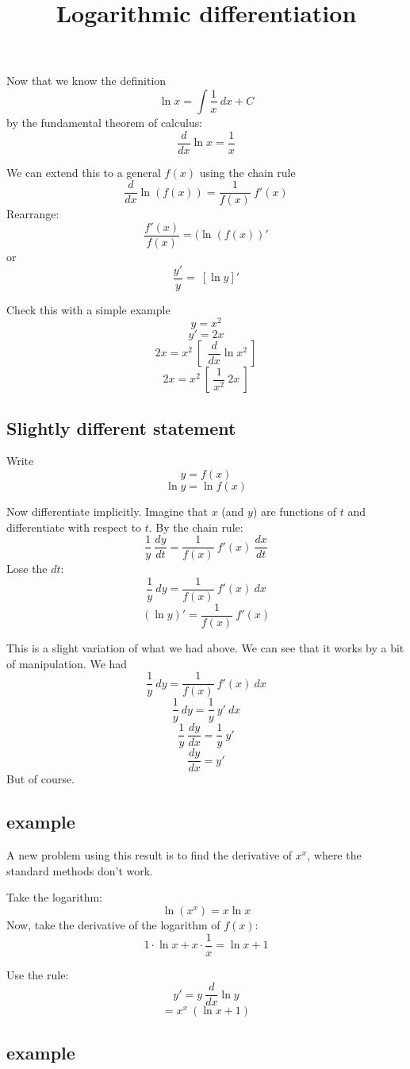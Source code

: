 \documentclass[11pt, oneside]{article}
\title{Logarithmic differentiation}
\date{}
\begin{document}
\maketitle
\Large


Now that we know the definition
\[ \ln x = \int \frac{1}{x} \ dx + C \]
by the fundamental theorem of calculus:
\[ \frac{d}{dx} \ln x = \frac{1}{x} \]

We can extend this to a general $f(x)$ using the chain rule
\[ \frac{d}{dx} \ln (f(x)) = \frac{1}{f(x)} \ f'(x) \]
Rearrange:
\[ \frac{f'(x)}{f(x)} = (\ln (f(x))' \]
or
\[ \frac{y'}{y} =  \ [ \ln y ]' \]

Check this with a simple example
\[ y = x^2 \]
\[ y' = 2x \]
\[ 2x = x^2 \ [ \ \ \frac{d}{dx} \ln x^2 \ ] \]
\[ 2x = x^2 \ [ \  \frac{1}{x^2} \ 2x \ ] \]

\subsection*{Slightly different statement}
Write
\[ y = f(x) \]
\[ \ln y = \ln f(x) \]

Now differentiate implicitly.  Imagine that $x$ (and $y$) are functions of $t$ and differentiate with respect to $t$.  By the chain rule:
\[ \frac{1}{y} \ \frac{dy}{dt} = \frac{1}{f(x)} \ f'(x) \ \frac{dx}{dt} \]
Lose the $dt$:
\[ \frac{1}{y} \ dy = \frac{1}{f(x)} \ f'(x) \ dx \]
\[ (\ln y)' = \frac{1}{f(x)} \ f'(x) \]

This is a slight variation of what we had above.  We can see that it works by a bit of manipulation.  We had
\[ \frac{1}{y} \ dy = \frac{1}{f(x)} \ f'(x) \ dx \]
\[ \frac{1}{y} \ dy = \frac{1}{y} \ y' \ dx \]
\[ \frac{1}{y} \ \frac{dy}{dx} = \frac{1}{y} \ y'  \]
\[ \frac{dy}{dx} = y'  \]
But of course.

\subsection*{example}

A new problem using this result is to find the derivative of $x^x$, where the standard methods don't work.  

Take the logarithm:
\[ \ln (x^x) = x \ln x \]
Now, take the derivative of the logarithm of $f(x)$:
\[ 1 \cdot \ln x + x \cdot \frac{1}{x} = \ln x + 1 \]

Use the rule:
\[ y' = y  \ \frac{d}{dx} \ln y \]
\[ = x^x \  (\ln x + 1) \]

\subsection*{example}
\end{document}
